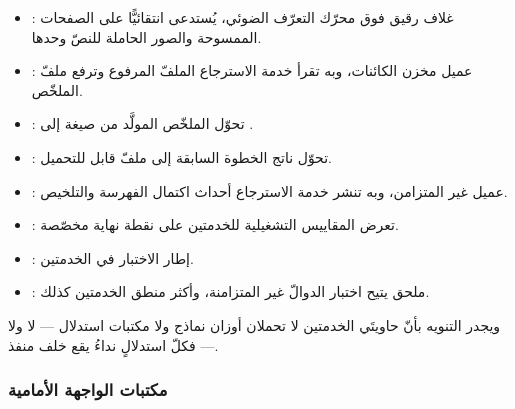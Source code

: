 \begin{itemize}
  \item \textbf{}: غلاف رقيق فوق محرّك التعرّف الضوئي، يُستدعى انتقائيًّا على الصفحات الممسوحة والصور الحاملة للنصّ وحدها.

  \item \textbf{}: عميل مخزن الكائنات، وبه تقرأ خدمة الاسترجاع الملفّ المرفوع وترفع ملفّ الملخّص.

  \item \textbf{}: تحوّل الملخّص المولَّد من صيغة  إلى .

  \item \textbf{}: تحوّل ناتج الخطوة السابقة إلى ملفّ  قابل للتحميل.

  \item \textbf{}: عميل  غير المتزامن، وبه تنشر خدمة الاسترجاع أحداث اكتمال الفهرسة والتلخيص.

  \item \textbf{}: تعرض المقاييس التشغيلية للخدمتين على نقطة نهاية مخصّصة.

  \item \textbf{}: إطار الاختبار في الخدمتين.

  \item \textbf{}: ملحق يتيح اختبار الدوالّ غير المتزامنة، وأكثر منطق الخدمتين كذلك.
\end{itemize}

ويجدر التنويه بأنّ حاويتَي الخدمتين لا تحملان أوزان نماذج ولا مكتبات استدلال — لا  ولا  — فكلّ استدلالٍ نداءُ  يقع خلف منفذ.

\subsubsection{مكتبات الواجهة الأمامية}

